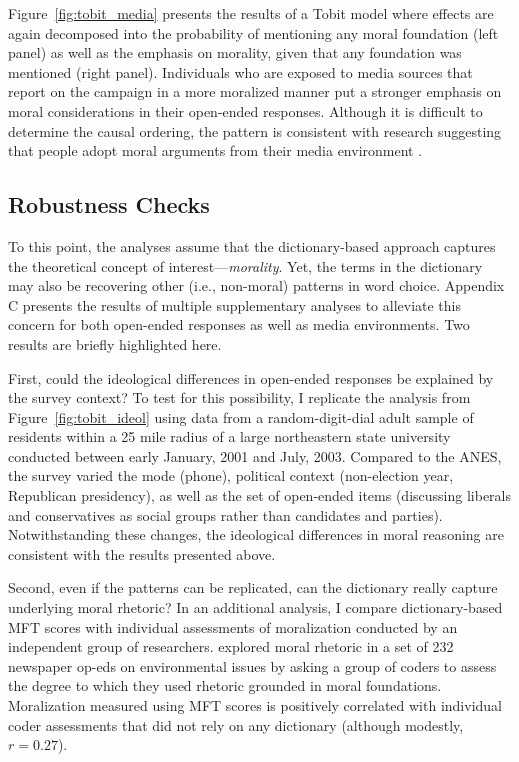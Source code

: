 \documentclass[12pt]{article}
\begin{document}
Figure~\ref{fig:tobit_media} presents the results of a Tobit model where effects are again decomposed into the probability of mentioning any moral foundation (left panel) as well as the emphasis on morality, given that any foundation was mentioned (right panel). Individuals who are exposed to media sources that report on the campaign in a more moralized manner put a stronger emphasis on moral considerations in their open-ended responses. Although it is difficult to determine the causal ordering, the pattern is consistent with research suggesting that people adopt moral arguments from their media environment \citep[e.g.,][]{clifford2015concerns}. 


\subsection*{Robustness Checks}

To this point, the analyses assume that the dictionary-based approach captures the theoretical concept of interest---\textit{morality}. Yet, the terms in the dictionary may also be recovering other (i.e., non-moral) patterns in word choice. Appendix C presents the results of multiple supplementary analyses to alleviate this concern for both open-ended responses as well as media environments. Two results are briefly highlighted here.

First, could the ideological differences in open-ended responses be explained by the survey context? To test for this possibility, I replicate the analysis from Figure~\ref{fig:tobit_ideol} using data from a random-digit-dial adult sample of residents within a 25 mile radius of a large northeastern state university conducted between early January, 2001 and July, 2003. Compared to the ANES, the survey varied the mode (phone), political context (non-election year, Republican presidency), as well as the set of open-ended items (discussing liberals and conservatives as social groups rather than candidates and parties). Notwithstanding these changes, the ideological differences in moral reasoning are consistent with the results presented above.

Second, even if the patterns can be replicated, can the dictionary really capture underlying moral rhetoric? In an additional analysis, I compare dictionary-based MFT scores with individual assessments of moralization conducted by an independent group of researchers. \citet{feinberg2013moral} explored moral rhetoric in a set of 232 newspaper op-eds on environmental issues by asking a group of coders to assess the degree to which they used rhetoric grounded in moral foundations. Moralization measured using MFT scores is positively correlated with individual coder assessments that did not rely on any dictionary (although modestly, $r=0.27$).
\end{document}
